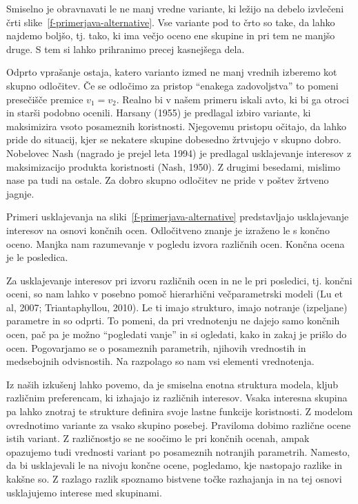 Smiselno je obravnavati le ne manj vredne variante, ki ležijo na debelo izvlečeni črti slike~\ref{f-primerjava-alternative}. Vse variante pod to črto so take, da lahko najdemo boljšo, tj. tako, ki ima večjo oceno ene skupine in pri tem ne manjšo druge. S tem si lahko prihranimo precej kasnejšega dela.

Odprto vprašanje ostaja, katero varianto izmed ne manj vrednih izberemo kot skupno odločitev. Če se odločimo za pristop ``enakega zadovoljstva'' to pomeni presečišče premice $v_1=v_2$. Realno bi v našem primeru iskali avto, ki bi ga otroci in starši podobno ocenili. Harsany (1955) je predlagal izbiro variante, ki maksimizira vsoto posameznih koristnosti. Njegovemu pristopu očitajo, da lahko pride do situacij, kjer se nekatere skupine dobesedno žrtvujejo v skupno dobro. Nobelovec Nash (nagrado je prejel leta 1994) je predlagal usklajevanje interesov z maksimizacijo produkta koristnosti (Nash, 1950). Z drugimi besedami, mislimo nase pa tudi na ostale. Za dobro skupno odločitev ne pride v poštev žrtveno jagnje. 

Primeri usklajevanja na sliki~\ref{f-primerjava-alternative} predstavljajo usklajevanje interesov na osnovi končnih ocen. Odločitveno znanje je izraženo le s končno oceno. Manjka nam razumevanje v pogledu izvora različnih ocen. Končna ocena je le posledica.

Za usklajevanje interesov pri izvoru različnih ocen in ne le pri posledici, tj. končni oceni, so nam lahko v posebno pomoč hierarhični večparametrski modeli (Lu et al, 2007; Triantaphyllou, 2010). Le ti imajo strukturo, imajo notranje (izpeljane) parametre in so odprti. To pomeni, da pri vrednotenju ne dajejo samo končnih ocen, pač pa je možno ``pogledati vanje'' in si ogledati, kako in zakaj je prišlo do ocen. Pogovarjamo se o posameznih parametrih, njihovih vrednostih in medsebojnih odvisnostih. Na razpolago so nam vsi elementi vrednotenja.

Iz naših izkušenj lahko povemo, da je smiselna enotna struktura modela, kljub različnim preferencam, ki izhajajo iz različnih interesov. Vsaka interesna skupina pa lahko znotraj te strukture definira svoje lastne funkcije koristnosti. Z modelom ovrednotimo variante za vsako skupino posebej. Praviloma dobimo različne ocene istih variant. Z različnostjo se ne soočimo le pri končnih ocenah, ampak opazujemo tudi vrednosti variant po posameznih notranjih parametrih. Namesto, da bi usklajevali le na nivoju končne ocene, pogledamo, kje nastopajo razlike in kakšne so. Z razlago razlik spoznamo bistvene točke razhajanja in na tej osnovi usklajujemo interese med skupinami.


